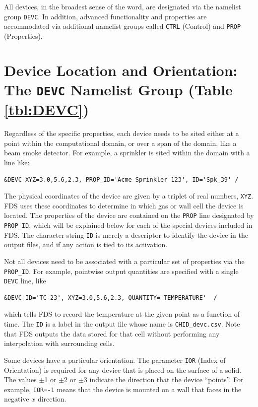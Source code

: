 \documentclass[11pt]{book}
\newcommand{\ct}{\tt\small}
\begin{document}
All devices, in the broadest sense of the word,
are designated via the namelist group {\ct DEVC}.
In addition, advanced functionality and properties are accommodated
via additional namelist groups called {\ct CTRL} (Control) and
{\ct PROP} (Properties).




\section{Device Location and Orientation: The \texorpdfstring{{\tt DEVC}}{DEVC} Namelist Group (Table \ref{tbl:DEVC})}
\label{info:DEVC}

Regardless of the specific properties, each device needs to be sited either at a point within the computational domain, or
over a span of the domain, like a beam smoke detector. For example, a sprinkler is sited within the domain with a line like:

\footnotesize
\begin{verbatim}
&DEVC XYZ=3.0,5.6,2.3, PROP_ID='Acme Sprinkler 123', ID='Spk_39' /
\end{verbatim}
\normalsize

\noindent
The physical coordinates of the
device are given by a triplet of real numbers, {\ct XYZ}.  FDS uses these coordinates to determine in which gas or wall cell the device is located.
The properties of the device are contained on the {\ct PROP} line
designated by {\ct PROP\_ID}, which will be explained below for each of the
special devices included in FDS.
The character string {\ct ID} is merely a descriptor to identify the
device in the output files, and if any action is tied to its activation.

Not all devices need to be associated with a particular set of properties via the {\ct PROP\_ID}. For example, pointwise
output quantities are specified with a single {\ct DEVC} line, like

\footnotesize
\begin{verbatim}
&DEVC ID='TC-23', XYZ=3.0,5.6,2.3, QUANTITY='TEMPERATURE'  /
\end{verbatim}
\normalsize

\noindent
which tells FDS to record the temperature at the given point as a function of time. The {\ct ID} is a label in the output file whose name
is {\ct CHID\_devc.csv}. Note that FDS outputs the data stored for that cell without performing any interpolation with surrounding cells.

Some devices have a particular orientation.
The parameter {\ct IOR} (Index of Orientation) is required for any device that is
placed on the surface of a solid. The values $\pm$1 or $\pm$2 or $\pm$3 indicate the direction
that the device ``points''. For example, {\ct IOR=-1} means that the device is mounted on a wall that faces in the negative $x$ direction.
\end{document}

